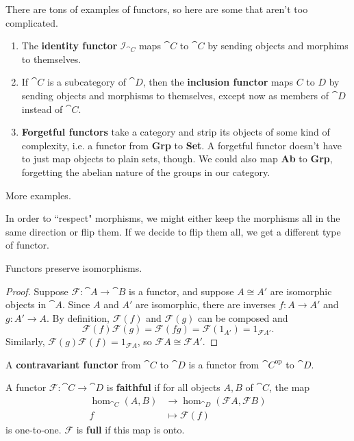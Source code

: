 \documentclass[twoside,10pt]{report}
\DeclareMathOperator{\op}{op}
\begin{document}
There are tons of examples of functors, so here are some that aren't too complicated.
\begin{enumerate}
	\item The \textbf{identity functor} $\mathcal{I}_{\cat{C}}$ maps $\cat{C}$ to $\cat{C}$ by sending objects and morphims to themselves.
	\item If $\cat{C}$ is a subcategory of $\cat{D}$, then the \textbf{inclusion functor} maps $C$ to $D$ by sending objects and morphisms to themselves, except now as members of $\cat{D}$ instead of $\cat{C}$.
	\item \textbf{Forgetful functors} take a category and strip its objects of some kind of complexity, i.e. a functor from \textbf{Grp} to \textbf{Set}. A forgetful functor doesn't have to just map objects to plain sets, though. We could also map \textbf{Ab} to \textbf{Grp}, forgetting the abelian nature of the groups in our category.
\end{enumerate}

{\color{red}More examples.}

In order to ``respect" morphisms, we might either keep the morphisms all in the same direction or flip them. If we decide to flip them all, we get a different type of functor.

\begin{prop}
Functors preserve isomorphisms.
\end{prop}
\begin{proof}
	Suppose $\mathcal{F}:\cat{A}\to \cat{B}$ is a functor, and suppose $A \cong A'$ are isomorphic objects in $\cat{A}$. Since $A$ and $A'$ are isomorphic, there are inverses $f:A\to A'$ and $g:A'\to A$. By definition, $\mathcal{F}(f)$ and $\mathcal{F}(g)$ can be composed and
	\[
		\mathcal{F}(f)\mathcal{F}(g) = \mathcal{F}(fg) = \mathcal{F}(1_{A'}) = 1_{\mathcal{F}A'}.
	\] Similarly, $\mathcal{F}(g)\mathcal{F}(f)=1_{\mathcal{F}A}$, so $\mathcal{F}A \cong \mathcal{F}A'$.
\end{proof}

\begin{defn}
	A \textbf{contravariant functor} from $\cat{C}$ to $\cat{D}$ is a functor from $\cat{C}^{\op}$ to $\cat{D}$.
\end{defn}

\begin{defn}
A functor $\mathcal{F}:\cat{C}\to \cat{D}$ is \textbf{faithful} if for all objects $A,B$ of $\cat{C}$, the map
\begin{align*}
	\hom_{\cat{C}}(A,B) &\to \hom_{\cat{D}}(\mathcal{F}A, \mathcal{F}B) \\
	f &\mapsto \mathcal{F}(f)
\end{align*} is one-to-one. $\mathcal{F}$ is \textbf{full} if this map is onto.
\end{defn}
\end{document}

